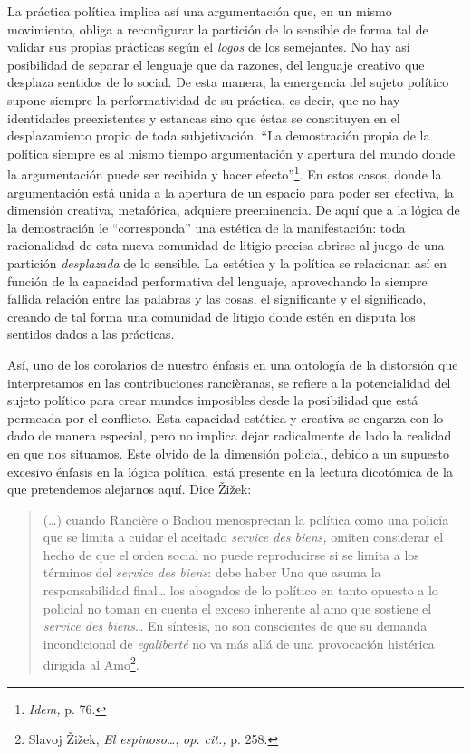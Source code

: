 La práctica política implica así una argumentación que, en un mismo movimiento, obliga a reconfigurar la partición de lo sensible de forma tal de validar sus propias prácticas según el \emph{logos} de los semejantes. No hay así posibilidad de separar el lenguaje que da razones, del lenguaje creativo que desplaza sentidos de lo social. De esta manera, la emergencia del sujeto político supone siempre la performatividad de su práctica, es decir, que no hay identidades preexistentes y estancas sino que éstas se constituyen en el desplazamiento propio de toda subjetivación. \enquote{La demostración propia de la política siempre es al mismo tiempo argumentación y apertura del mundo donde la argumentación puede ser recibida y hacer efecto}\footnote{\emph{Idem,} p. 76.}. En estos casos, donde la argumentación está unida a la apertura de un espacio para poder ser efectiva, la dimensión creativa, metafórica, adquiere preeminencia. De aquí que a la lógica de la demostración le \enquote{corresponda} una estética de la manifestación: toda racionalidad de esta nueva comunidad de litigio precisa abrirse al juego de una partición \emph{desplazada} de lo sensible. La estética y la política se relacionan así en función de la capacidad performativa del lenguaje, aprovechando la siempre fallida relación entre las palabras y las cosas, el significante y el significado, creando de tal forma una comunidad de litigio donde estén en disputa los sentidos dados a las prácticas.

Así, uno de los corolarios de nuestro énfasis en una ontología de la distorsión que interpretamos en las contribuciones rancièranas, se refiere a la potencialidad del sujeto político para crear mundos imposibles desde la posibilidad que está permeada por el conflicto. Esta capacidad estética y creativa se engarza con lo dado de manera especial, pero no implica dejar radicalmente de lado la realidad en que nos situamos. Este olvido de la dimensión policial, debido a un supuesto excesivo énfasis en la lógica política, está presente en la lectura dicotómica de la que pretendemos alejarnos aquí. Dice Žižek:

\begin{quote}
(\dots) cuando Rancière o Badiou menosprecian la política como una policía que se limita a cuidar el aceitado \emph{service des biens,} omiten considerar el hecho de que el orden social no puede reproducirse si se limita a los términos del \emph{service des biens}: debe haber Uno que asuma la responsabilidad final\ldots{} los abogados de lo político en tanto opuesto a lo policial no toman en cuenta el exceso inherente al amo que sostiene el \emph{service des biens}\ldots{} En síntesis, no son conscientes de que su demanda incondicional de \emph{egaliberté} no va más allá de una provocación histérica dirigida al Amo\footnote{Slavoj Žižek, \emph{El espinoso\ldots{}}, \emph{op. cit.,} p. 258.}.
\end{quote}

